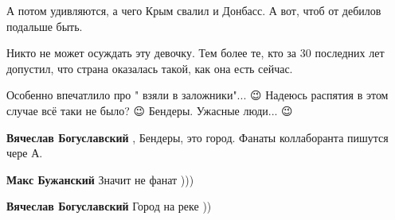 \begin{itemize}
 
А потом удивляются, а чего Крым свалил и Донбасс.
А вот, чтоб от дебилов подальше быть.

 
Никто не может осуждать эту девочку. Тем более те, кто за 30 последних лет допустил, что страна оказалась такой, как она есть сейчас.

 
Особенно впечатлило про " взяли в заложники"... 😉 Надеюсь распятия в этом
случае всё таки не было? 😉 Бендеры. Ужасные люди... 😉

\begin{itemize}
 
\textbf{Вячеслав Богуславский} , Бендеры, это город.
Фанаты коллаборанта пишутся чере А.

 
\textbf{Макс Бужанский} Значит не фанат )))

 
\textbf{Вячеслав Богуславский} Город на реке ))


\end{itemize}
\end{itemize}
